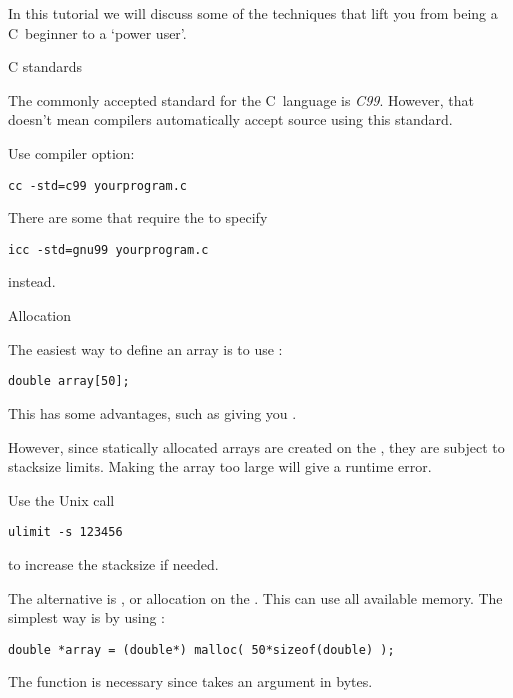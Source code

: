 
In this tutorial we will discuss some of the techniques that lift you
from being a C~beginner to a `power user'.

 {C standards}

The commonly accepted standard for the C~language is
\emph{C99}. However, that doesn't mean compilers
automatically accept source using this standard.

Use compiler option:
\begin{verbatim}
cc -std=c99 yourprogram.c
\end{verbatim}
There are some  that require the
 to specify
\begin{verbatim}
icc -std=gnu99 yourprogram.c
\end{verbatim}
instead.

 {Allocation}

The easiest way to define an array is to use
:
\begin{verbatim}
double array[50];
\end{verbatim}
This has some advantages, such as giving you
.

However, since statically allocated arrays are created on the
, they are subject to stacksize limits. Making the
array too large will give a runtime error.

Use the Unix
call
\begin{verbatim}
ulimit -s 123456
\end{verbatim}
to increase the stacksize if needed. 

The alternative is , or allocation
on the . This can use all available memory. The
simplest way is by using :
\begin{verbatim}
double *array = (double*) malloc( 50*sizeof(double) );
\end{verbatim}
The  function is necessary since  takes
an argument in bytes.

